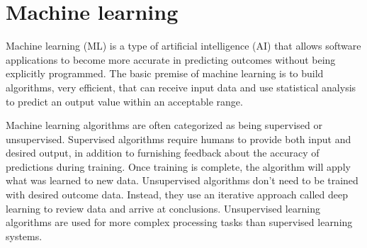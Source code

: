 \section{Machine learning}

Machine learning (ML) is a type of artificial intelligence (AI) that allows software applications to become more accurate in predicting outcomes without being explicitly programmed. The basic premise of machine learning is to build algorithms, very efficient, that can receive input data and use statistical analysis to predict an output value within an acceptable range.

Machine learning algorithms are often categorized as being supervised or unsupervised. Supervised algorithms require humans to provide both input and desired output, in addition to furnishing feedback about the accuracy of predictions during training. Once training is complete, the algorithm will apply what was learned to new data. Unsupervised algorithms don't need to be trained with desired outcome data. Instead, they use an iterative approach called deep learning to review data and arrive at conclusions. Unsupervised learning algorithms are used for more complex processing tasks than supervised learning systems.





